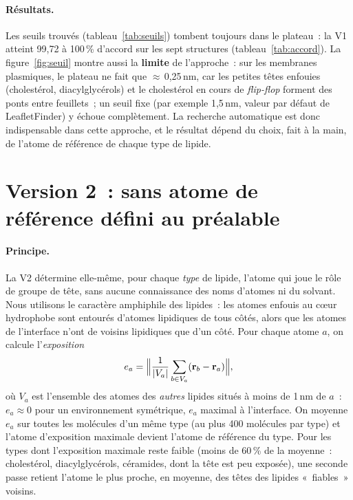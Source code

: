 \documentclass[11pt,a4paper]{article}
\begin{document}
\paragraph{Résultats.} Les seuils trouvés (tableau~\ref{tab:seuils}) tombent toujours dans le plateau~: la V1
atteint 99,72 à 100\,\% d'accord sur les sept structures (tableau~\ref{tab:accord}). La figure~\ref{fig:seuil}
montre aussi la \textbf{limite} de l'approche~: sur les membranes plasmiques, le plateau ne fait que
$\approx$\,0,25\,nm, car les petites têtes enfouies (cholestérol, diacylglycérols) et le cholestérol en cours de
\emph{flip-flop} forment des ponts entre feuillets~; un seuil fixe (par exemple 1,5\,nm, valeur par défaut de
LeafletFinder) y échoue complètement. La recherche automatique est donc indispensable dans cette approche, et le
résultat dépend du choix, fait à la main, de l'atome de référence de chaque type de lipide.

\section{Version 2~: sans atome de référence défini au préalable}\label{sec:v2}
\paragraph{Principe.} La V2 détermine elle-même, pour chaque \emph{type} de lipide, l'atome qui joue le rôle de
groupe de tête, sans aucune connaissance des noms d'atomes ni du solvant. Nous utilisons le caractère amphiphile
des lipides~: les atomes enfouis au cœur hydrophobe sont entourés d'atomes lipidiques de tous côtés, alors que les
atomes de l'interface n'ont de voisins lipidiques que d'un côté. Pour chaque atome $a$, on calcule l'\emph{exposition}
\[ e_a=\Bigl\|\frac{1}{|V_a|}\sum_{b\in V_a}(\mathbf r_b-\mathbf r_a)\Bigr\| ,\]
où $V_a$ est l'ensemble des atomes des \emph{autres} lipides situés à moins de 1\,nm de $a$~: $e_a\approx0$ pour
un environnement symétrique, $e_a$ maximal à l'interface. On moyenne $e_a$ sur toutes les molécules d'un même type
(au plus 400 molécules par type) et l'atome d'exposition maximale devient l'atome de référence du type. Pour les
types dont l'exposition maximale reste faible (moins de 60\,\% de la moyenne~: cholestérol, diacylglycérols,
céramides, dont la tête est peu exposée), une seconde passe retient l'atome le plus proche, en moyenne, des têtes
des lipides «~fiables~» voisins.
\end{document}
